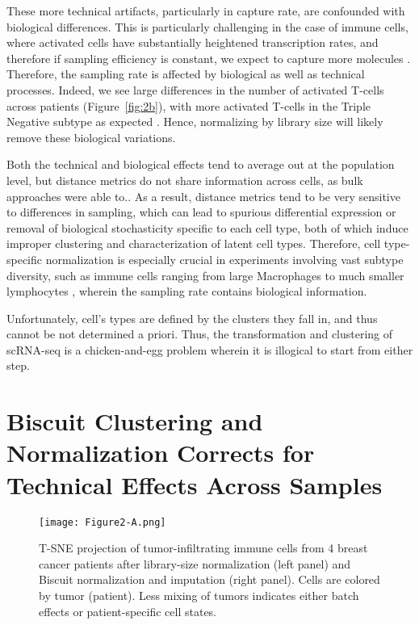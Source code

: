 These more technical artifacts, particularly in capture rate, are confounded with biological differences. 
This is particularly challenging in the case of immune cells, where activated cells have substantially heightened transcription rates, and therefore if sampling efficiency is constant, we expect to capture more molecules \citep{Blackinton2016,Cheadle2005,Singer2016}. 
Therefore, the sampling rate is affected by biological as well as technical processes. 
Indeed, we see large differences in the number of activated T-cells across patients (Figure~\ref{fig:2b}), with more activated T-cells in the Triple Negative subtype as expected \citep{Dushyanthen2015}.
Hence, normalizing by library size will likely remove these biological variations.

Both the technical and biological effects tend to average out at the population level, but distance metrics do not share information across cells, as bulk approaches were able to..
As a result, distance metrics tend to be very sensitive to differences in sampling, which can lead to spurious differential expression or removal of biological stochasticity specific to each cell type, both of which induce improper clustering and characterization of latent cell types.
Therefore, cell type-specific normalization is especially crucial in experiments involving vast subtype diversity, such as immune cells ranging from large Macrophages to much smaller lymphocytes \citep{Lun2016,Vallejos2017}, wherein the sampling rate contains biological information. 

Unfortunately, cell's types are defined by the clusters they fall in, and thus cannot be not determined a priori. 
Thus, the transformation and clustering of scRNA-seq is a chicken-and-egg problem wherein it is illogical to start from either step.

\section{Biscuit Clustering and Normalization Corrects for Technical Effects Across Samples}

\begin{figure}
\centering
\texttt{[image: Figure2-A.png]}
\caption{T-SNE projection of tumor-infiltrating immune cells from 4 breast cancer patients after library-size normalization (left panel) and Biscuit normalization and imputation (right panel). Cells are colored by tumor (patient). Less mixing of tumors indicates either batch effects or patient-specific cell states.
}
\label{fig:2a}
\end{figure}

